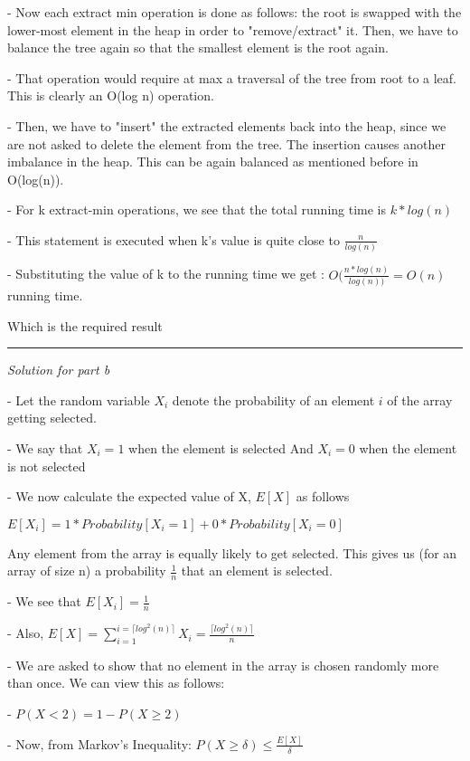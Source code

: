 \documentclass[11pt]{article}
\begin{document}
- Now each extract min operation is done as follows: the root is swapped with the lower-most element in the heap in order to "remove/extract" it. Then, we have to balance the tree again so that the smallest element is the root again.

- That operation would require at max a traversal of the tree from root to a leaf. This is clearly an O(log n) operation. 

- Then, we have to "insert" the extracted elements back into the heap, since we are not asked to delete the element from the tree. The insertion causes another imbalance in the heap. This can be again balanced as mentioned before in O(log(n)).

- For k extract-min operations, we see that the total running time is $k*log(n)$

- This statement is executed when k's value is quite close to $\frac{n}{log(n)}$

- Substituting the value of k to the running time we get : $O(\frac{n*log(n)}{log(n))} = O(n)$ running time.

Which is the required result

\medskip

\noindent\rule{8cm}{0.4pt}

\medskip

\textit{Solution for part b}

\medskip

- Let the random variable $X_i$ denote the probability of an element $i$ of the array getting selected.

- We say that $X_i = 1$ when the element is selected
And $X_i=0$ when the element is not selected

- We now calculate the expected value of X, $E[X]$ as follows

$E[X_i] = 1*Probability[X_i = 1] + 0*Probability[X_i = 0]$

Any element from the array is equally likely to get selected. This gives us (for an array of size n) a probability $\frac{1}{n}$ that an element is selected.

- We see that $E[X_i] = \frac{1}{n}$

- Also, $E[X] = \sum_{i=1}^{i=\lceil log^2 (n)\rceil}X_i = \frac{\lceil log^2 (n)\rceil}{n}$

- We are asked to show that no element in the array is chosen randomly more than once. We can view this as follows:

- $P(X<2) = 1-P(X\geq 2)$

- Now, from Markov's Inequality: $P(X\geq \delta ) \leq \frac{E[X]}{\delta}$
\end{document}
